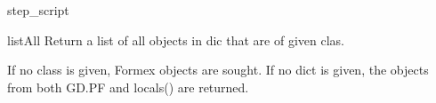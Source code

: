 \begin{funcdesc}{step_script}{}


\end{funcdesc}


\begin{funcdesc}{listAll}{}
Return a list of all objects in dic that are of given clas.

    If no class is given, Formex objects are sought.
    If no dict is given, the objects from both GD.PF and locals()
    are returned.
    

\end{funcdesc}



